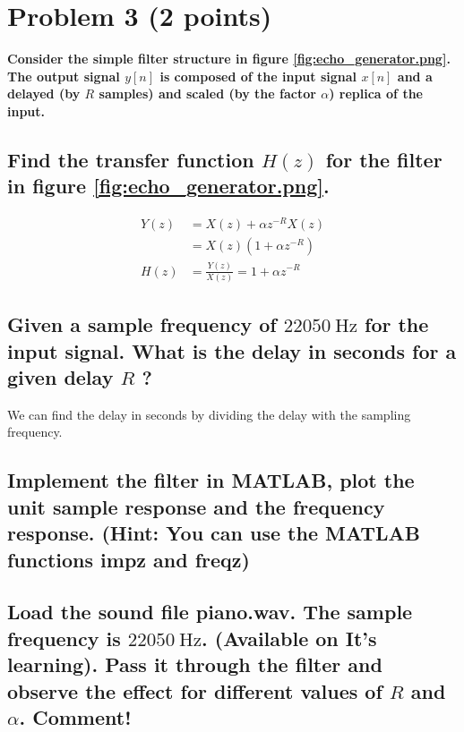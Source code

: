 \section{Problem 3 (2 points)}

\textbf{Consider the simple filter structure in figure \ref{fig:echo_generator.png}. The output signal $y[n]$ is
composed of the input signal $x[n]$ and a delayed (by $R$ samples) and scaled
(by the factor $\alpha$) replica of the input.}

\subsection*{Find the transfer function $H(z)$ for the filter in figure \ref{fig:echo_generator.png}. }

$$
\begin{aligned}
Y(z) & =X(z)+\alpha z^{-R} X(z) \\
& =X(z)\left(1+\alpha z^{-R}\right) \\
H(z) & =\frac{Y(z)}{X(z)}=1+\alpha z^{-R}
\end{aligned}
$$

\subsection*{Given a sample frequency of $22050 \mathrm{~Hz}$ for the input signal. What is the delay in
seconds for a given delay $R$ ? }

We can find the delay in seconds by dividing the delay with the sampling frequency.

\subsection*{Implement the filter in MATLAB, plot the unit sample response and the frequency response. (Hint: You can use the MATLAB functions impz and freqz) }

\subsection*{Load the sound file piano.wav. The sample frequency is $22050 \mathrm{~Hz}$. (Available on It's learning). Pass it through the filter and observe the effect for different values of $R$ and $\alpha$. Comment!}

